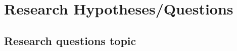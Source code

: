 \newpage
\section{Research Hypotheses/Questions}

\lipsum[5]

\lipsum[5]

\lipsum[5]

\subsection{Research questions topic}

\lipsum[5]

\lipsum[5]